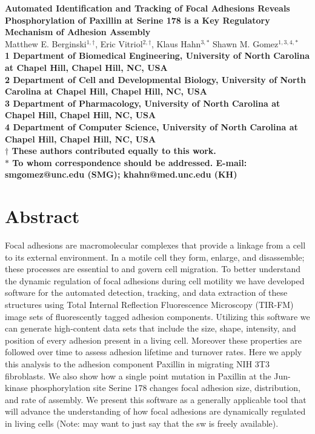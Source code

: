 \documentclass[10pt]{article}
\date{}
\begin{document}
\begin{flushleft}
{\Large
\textbf{Automated Identification and Tracking of Focal Adhesions Reveals Phosphorylation of Paxillin at Serine 178 is a Key Regulatory Mechanism of Adhesion Assembly}
}
\\
Matthew E. Berginski$^{1,\dagger}$, 
Eric Vitriol$^{2,\dagger}$, 
Klaus Hahn$^{3,\ast}$
Shawn M. Gomez$^{1,3,4,\ast}$
\\
\bf{1} Department of Biomedical Engineering, University of North Carolina at Chapel Hill, Chapel Hill, NC, USA
\\
\bf{2} Department of Cell and Developmental Biology, University of North Carolina at Chapel Hill, Chapel Hill, NC, USA
\\
\bf{3} Department of Pharmacology, University of North Carolina at Chapel Hill, Chapel Hill, NC, USA
\\
\bf{4} Department of Computer Science, University of North Carolina at Chapel Hill, Chapel Hill, NC, USA
\\
$\dagger$ These authors contributed equally to this work.
\\
$\ast$ To whom correspondence should be addressed. E-mail: smgomez@unc.edu (SMG); khahn@med.unc.edu (KH)
\end{flushleft}

\section*{Abstract}

Focal adhesions are macromolecular complexes that provide a linkage from a cell
to its external environment. In a motile cell they form, enlarge, and
disassemble; these processes are essential to and govern cell migration. To
better understand the dynamic regulation of focal adhesions during cell motility
we have developed software for the automated detection, tracking, and data
extraction of these structures using Total Internal Reflection Fluorescence
Microscopy (TIR-FM) image sets of fluorescently tagged adhesion components.
Utilizing this software we can generate high-content data sets that include the size, shape,
intensity, and position of every adhesion present in a living cell. Moreover these properties are followed over time to assess adhesion lifetime and
turnover rates. Here we apply this analysis to the adhesion component Paxillin in migrating NIH 3T3 fibroblasts. We also show how a single point mutation
in Paxillin at the Jun-kinase phosphorylation site Serine 178 changes focal
adhesion size, distribution, and rate of assembly. We present this  software as a
generally applicable tool that will advance the understanding of how focal
adhesions are dynamically regulated in living cells (Note: may want to just say
that the sw is freely available).
\end{document}
